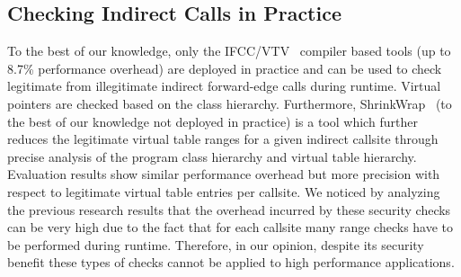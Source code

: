 % 
% 
% 

\subsection{Checking Indirect Calls in Practice}
\label{C++ Indirect Calls in Practice}
To the best of our knowledge, only the IFCC/VTV~\cite{vtv:tice} compiler based tools (up to 8.7\% performance overhead) are deployed in practice
and can be used to check legitimate from illegitimate indirect forward-edge calls during runtime. Virtual pointers are checked based on the class hierarchy. 
Furthermore, ShrinkWrap~\cite{haller:shrinkwrap} (to the best of our knowledge not deployed in practice) is a tool which further reduces the legitimate 
virtual table ranges for a given indirect callsite through precise analysis of the program class hierarchy and virtual table hierarchy. Evaluation results
show similar performance overhead but more precision with respect to legitimate virtual table entries per callsite. We noticed by analyzing the previous 
research results that the overhead incurred by these security checks can be very high due to the fact that for each callsite many range checks have to be
performed during runtime. Therefore, in our opinion, despite its security benefit these types of checks cannot be applied to high performance applications.

